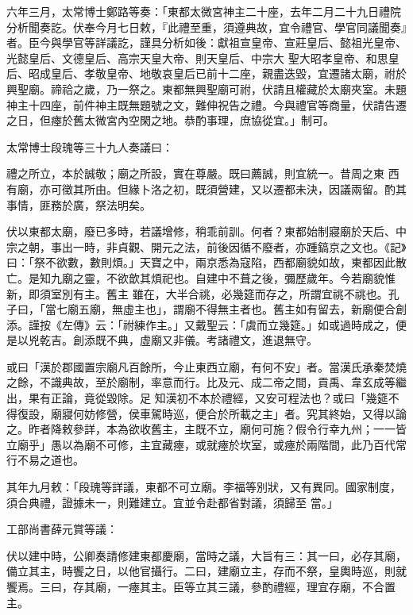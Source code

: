 \begin{pinyinscope}
 六年三月，太常博士鄭路等奏：「東都太微宮神主二十座，去年二月二十九日禮院分析聞奏訖。伏奉今月七日敕，『此禮至重，須遵典故，宜令禮官、學官同議聞奏』者。臣今與學官等詳議訖，謹具分析如後：獻祖宣皇帝、宣莊皇后、懿祖光皇帝、光懿皇后、文德皇后、高宗天皇大帝、則天皇后、中宗大
 聖大昭孝皇帝、和思皇后、昭成皇后、孝敬皇帝、地敬哀皇后已前十二座，親盡迭毀，宜遷諸太廟，祔於興聖廟。禘祫之歲，乃一祭之。東都無興聖廟可祔，伏請且權藏於太廟夾室。未題神主十四座，前件神主既無題號之文，難伸祝告之禮。今與禮官等商量，伏請告遷之日，但瘞於舊太微宮內空閑之地。恭酌事理，庶協從宜。」制可。



 太常博士段瑰等三十九人奏議曰：



 禮之所立，本於誠敬；廟之所設，實在尊嚴。既曰薦誠，則宜統一。昔周之東
 西有廟，亦可徵其所由。但緣卜洛之初，既須營建，又以遷都未決，因議兩留。酌其事情，匪務於廣，祭法明矣。



 伏以東都太廟，廢已多時，若議增修，稍乖前訓。何者？東都始制寢廟於天后、中宗之朝，事出一時，非貞觀、開元之法，前後因循不廢者，亦踵鎬京之文也。《記》曰：「祭不欲數，數則煩。」天寶之中，兩京悉為寇陷，西都廟貌如故，東都因此散亡。是知九廟之靈，不欲歆其煩祀也。自建中不葺之後，彌歷歲年。今若廟貌惟新，即須室別有主。舊主
 雖在，大半合祧，必幾筵而存之，所謂宜祧不祧也。孔子曰，「當七廟五廟，無虛主也」，謂廟不得無主者也。舊主如有留去，新廟便合創添。謹按《左傳》云：「祔練作主。」又戴聖云：「虞而立幾筵。」如或過時成之，便是以兇乾吉。創添既不典，虛廟又非儀。考諸禮文，進退無守。



 或曰「漢於郡國置宗廟凡百餘所，今止東西立廟，有何不安」者。當漢氏承秦焚燒之餘，不識典故，至於廟制，率意而行。比及元、成二帝之間，貢禹、韋玄成等繼出，果有正論，竟從毀除。足
 知漢初不本於禮經，又安可程法也？或曰「幾筵不得復設，廟寢何妨修營，侯車駕時巡，便合於所載之主」者。究其終始，又得以論之。昨者降敕參詳，本為欲收舊主，主既不立，廟何可施？假令行幸九州；一一皆立廟乎」愚以為廟不可修，主宜藏瘞，或就瘞於坎室，或瘞於兩階間，此乃百代常行不易之道也。



 其年九月敕：「段瑰等詳議，東都不可立廟。李福等別狀，又有異同。國家制度，須合典禮，證據未一，則難建立。宜並令赴都省對議，須歸至
 當。」



 工部尚書薛元賞等議：



 伏以建中時，公卿奏請修建東都慶廟，當時之議，大旨有三：其一曰，必存其廟，備立其主，時饗之日，以他官攝行。二曰，建廟立主，存而不祭，皇輿時巡，則就饗焉。三曰，存其廟，一瘞其主。臣等立其三議，參酌禮經，理宜存廟，不合置主。




\end{pinyinscope}
